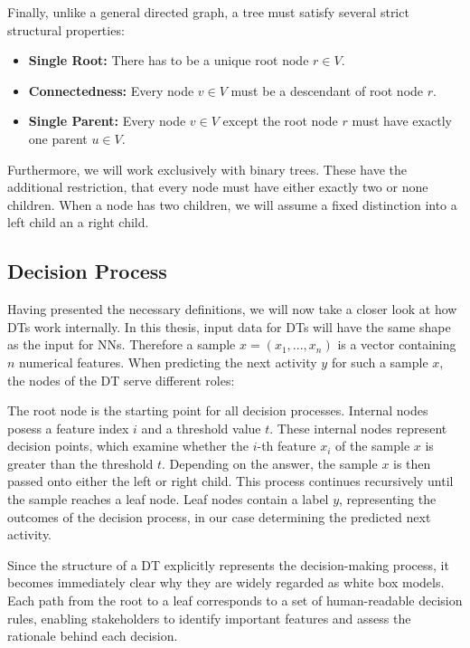 Finally, unlike a general directed graph, a tree must satisfy several strict structural properties: \cite{trees}
\begin{itemize}
  \item \textbf{Single Root:} There has to be a unique root node $r \in V$.
  \item \textbf{Connectedness:} Every node $v \in V$ must be a descendant of root node $r$.
  \item \textbf{Single Parent:} Every node $v \in V$ except the root node $r$ must have exactly one parent $u \in V$.
\end{itemize}
Furthermore, we will work exclusively with binary trees.
These have the additional restriction, that every node must have either exactly two or none children.
When a node has two children, we will assume a fixed distinction into a left child an a right child.

\subsection{Decision Process}
Having presented the necessary definitions,
we will now take a closer look at how DTs work internally.
In this thesis, input data for DTs will have the same shape as the input for NNs.
Therefore a sample $x = (x_1, ..., x_n)$ is a vector containing $n$ numerical features.
When predicting the next activity $y$ for such a sample $x$, the nodes of the DT serve different roles:

The root node is the starting point for all decision processes.
Internal nodes posess a feature index $i$ and a threshold value $t$.
These internal nodes represent decision points, which examine whether the $i$-th feature $x_i$ of the sample $x$
is greater than the threshold $t$.
Depending on the answer, the sample $x$ is then passed onto either the left or right child.
This process continues recursively until the sample reaches a leaf node.
Leaf nodes contain a label $y$, representing the outcomes of the decision process,
in our case determining the predicted next activity.


Since the structure of a DT explicitly represents the decision-making process,
it becomes immediately clear why they are widely regarded as white box models.
Each path from the root to a leaf corresponds to a set of human-readable decision rules,
enabling stakeholders to identify important features and assess the rationale behind each decision.

